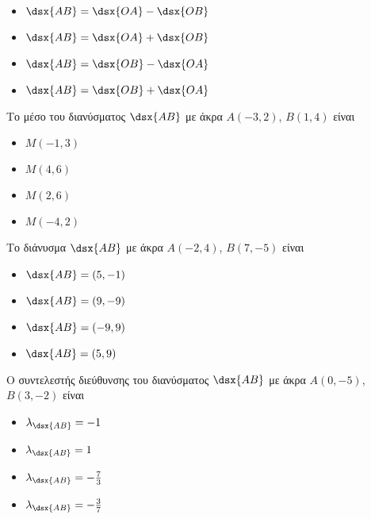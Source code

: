 \documentclass[twoside,nofonts,ektypwsh,math,spyros]{frontisthrio-diag}
\begin{document}
\begin{thema}
\begin{erwthma}
\begin{rlist}
\begin{multicols}{4}
\begin{itemize}
\item $ \dsx{AB}=\dsx{OA}-\dsx{OB} $
\item $ \dsx{AB}=\dsx{OA}+\dsx{OB} $
\item $ \dsx{AB}=\dsx{OB}-\dsx{OA} $
\item $ \dsx{AB}=\dsx{OB}+\dsx{OA} $
\end{itemize}
\end{multicols}
\item Το μέσο του διανύσματος $ \dsx{AB} $ με άκρα $ A(-3,2) $, $ B(1,4) $ είναι
\begin{multicols}{4}
\begin{itemize}
\item $ M(-1,3) $
\item $ M(4,6) $
\item $ M(2,6) $
\item $ M(-4,2) $
\end{itemize}
\end{multicols}
\item Το διάνυσμα $ \dsx{AB} $ με άκρα $ A(-2,4) $, $ B(7,-5) $ είναι
\begin{multicols}{4}
\begin{itemize}
\item $ \dsx{AB}=(5,-1) $
\item $ \dsx{AB}=(9,-9) $
\item $ \dsx{AB}=(-9,9) $
\item $ \dsx{AB}=(5,9) $
\end{itemize}
\end{multicols}
\item Ο συντελεστής διεύθυνσης του διανύσματος $ \dsx{AB} $ με άκρα $ A(0,-5) $, $ B(3,-2) $ είναι
\begin{multicols}{4}
\begin{itemize}
\item $ \lambda_{\dsx{AB}}=-1 $
\item $ \lambda_{\dsx{AB}}=1 $
\item $ \lambda_{\dsx{AB}}=-\frac{7}{3} $
\item $ \lambda_{\dsx{AB}}=-\frac{3}{7} $
\end{itemize}
\end{multicols}
\end{rlist}
\end{erwthma}
\item \mbox{}\\\vspace{-5mm}

\end{thema}
\end{document}
